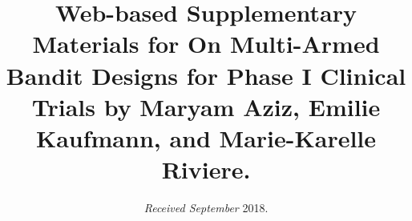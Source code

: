 \def \refThmSH {1}
\def \refThmTS {3}



\setcounter{footnote}{2}

\title[Web-based Supplementary Materials]{
Web-based Supplementary Materials for
On Multi-Armed Bandit Designs for Phase I Clinical Trials
by
Maryam Aziz,
Emilie Kaufmann, and
Marie-Karelle Riviere.}




\date{{\it Received September} 2018. 
}

\pagerange{\pageref{firstpage}--\pageref{lastpage}} 



\label{firstpage}


\maketitle

\backmatter



\FloatBarrier





\label{lastpage}



